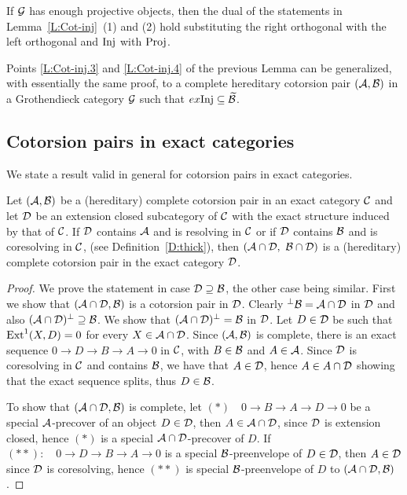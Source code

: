 %
%
%
%
%
%
%
%
%
\begin{rem} If  $\mathcal{G}$ has enough projective objects, then the dual of the statements in Lemma~\ref{L:Cot-inj}~(1) and (2) hold  substituting the right orthogonal with the left orthogonal and $\mathrm{Inj}$ with $\mathrm{Proj}$.
\end{rem}

Points \ref{L:Cot-inj.3} and \ref{L:Cot-inj.4} of the previous Lemma can be generalized, with essentially the same proof, to a complete hereditary cotorsion pair $(\mathcal{A},\mathcal{B})$ in a Grothendieck category $\mathcal{G}$ such that $ex \mathrm{Inj}\subseteq \widetilde{\mathcal{B}}$.

%
%
%
%
%
%
%
%
%
%
%
%
%
%
%
%


 \subsection{Cotorsion pairs in exact categories}

 We state a result valid in general for cotorsion pairs in exact categories.
 \begin{prop}\label{P:inducing} Let $(\mathcal{A}, \mathcal{B})$ be a (hereditary) complete cotorsion pair in an exact category $\mathcal{C}$ and let $\mathcal{D}$ be an extension closed subcategory of $\mathcal{C}$ with the exact structure induced by that of $\mathcal{C}$. If $\mathcal{D}$ contains $\mathcal{A}$ and is resolving in $\mathcal{C}$ or if $\mathcal{D}$ contains $\mathcal{B}$ and is coresolving in $\mathcal{C}$, (see Definition~\ref{D:thick}), then $(\mathcal{A}\cap\mathcal{D}, \ \mathcal{B}\cap\mathcal{D})$ is a (hereditary) complete cotorsion pair in the exact category $\mathcal{D}$.

 \end{prop}
 \begin{proof} We prove the statement in  case $\mathcal{D}\supseteq \mathcal{B}$, the other case being similar. First we show that $(\mathcal{A}\cap\mathcal{D}, \mathcal{B})$ is a cotorsion pair in $\mathcal{D}$.
 Clearly ${}^\perp{}\mathcal{B}= \mathcal{A}\cap \mathcal{D}$ in $\mathcal{D}$ and also $(\mathcal{A}\cap \mathcal{D}){}^\perp{} \supseteq \mathcal{B}$. We show that $(\mathcal{A}\cap \mathcal{D}){}^\perp{} =\mathcal{B}$ in $\mathcal{D}$.
 Let $D\in \mathcal{D}$ be such that $\operatorname{Ext}^1(X, D)=0$ for every $X\in \mathcal{A}\cap \mathcal{D}$. Since $(\mathcal{A}, \mathcal{B})$ is complete, there is an exact sequence $0\to D\to B\to A\to 0$ in $\mathcal{C}$, with $B\in \mathcal{B}$ and $A\in \mathcal{A}$. Since $\mathcal{D}$ is coresolving  in $\mathcal{C}$ and contains $\mathcal{B}$, we have that $A\in \mathcal{D}$, hence $A\in A\cap\mathcal{D}$ showing that the exact sequence splits, thus $D\in \mathcal{B}$.

To show that $(\mathcal{A}\cap\mathcal{D}, \mathcal{B})$ is complete, let $(\ast)\quad 0\to B\to A\to D\to 0$ be a special $\mathcal{A} $-precover of an object $D\in \mathcal{D}$, then $A\in \mathcal{A}\cap\mathcal{D}$, since $\mathcal{D}$ is extension closed, hence $(\ast)$ is a special $\mathcal{A}\cap \mathcal{D} $-precover of $D$. If $ (\ast\ast):\quad 0\to D\to B\to A\to 0$ is a special $\mathcal{B} $-preenvelope of $D\in \mathcal{D}$, then $A\in \mathcal{D}$ since $\mathcal{D}$ is coresolving, hence $(\ast\ast)$ is  special $\mathcal{B}$-preenvelope of $D$ \wrt to  $(\mathcal{A}\cap\mathcal{D}, \mathcal{B})$. \end{proof}



